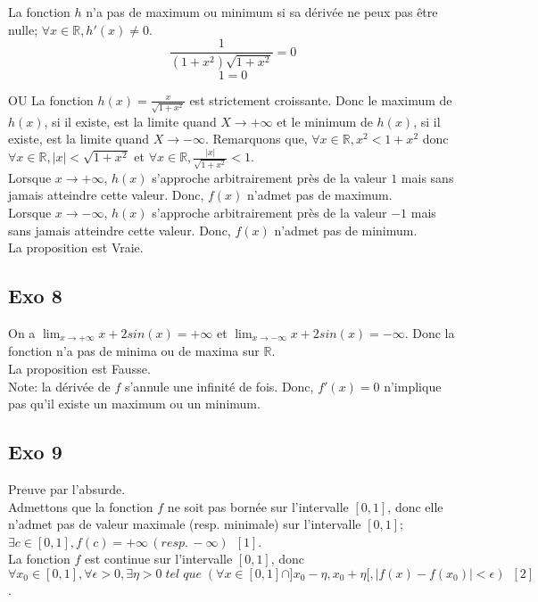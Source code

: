 \documentclass[]{book}
\theoremstyle{definition}
\newcommand{\bb}[1]{\mathbb{#1}}
\newcommand{\R}{\bb{R}}
\begin{document}
La fonction $h$ n'a pas de maximum ou minimum si sa d\'eriv\'ee ne peux pas \^etre nulle; $\forall x \in \R, h'(x) \neq 0$.
$$ \frac{1}{(1+x^2)\sqrt{1+x^2}} = 0 $$
$$ 1 = 0 $$


OU
La fonction $h(x) = \frac{x}{\sqrt{1+x^2}}$ est strictement croissante. Donc le maximum de $h(x)$, si il existe, est la limite quand $X \to +\infty$ et le minimum de $h(x)$, si il existe, est la limite quand $X \to -\infty$.
Remarquons que, $\forall x \in \R, x^2 < 1 + x^2$ donc $\forall x \in \R, |x| < \sqrt{1 + x^2}$ et $\forall x \in \R, \frac{|x|}{\sqrt{1 + x^2}} < 1$.\\
 
Lorsque $x \to +\infty$, $h(x)$ s'approche arbitrairement pr\`es de la valeur $1$ mais sans jamais atteindre cette valeur. Donc, $f(x)$ n'admet pas de maximum.\\

Lorsque $x \to -\infty$, $h(x)$ s'approche arbitrairement pr\`es de la valeur $-1$ mais sans jamais atteindre cette valeur. Donc, $f(x)$ n'admet pas de minimum.\\


La proposition est Vraie.



\subsection*{Exo 8}
On a $\lim_{x \to +\infty} x + 2sin(x) = +\infty$ et $\lim_{x \to -\infty} x + 2sin(x) = -\infty$. Donc la fonction n'a pas de minima ou de maxima sur $\R$.\\

La proposition est Fausse.\\

Note: la d\'eriv\'ee de $f$ s'annule une infinit\'e de fois. Donc, $f'(x)=0$ n'implique pas qu'il existe un maximum ou un minimum.


\subsection*{Exo 9}
Preuve par l'absurde. \\

Admettons que la fonction $f$ ne soit pas born\'ee sur l'intervalle $[0,1]$, donc elle n'admet pas de valeur maximale (resp. minimale) sur l'intervalle $[0,1]$; $\exists c \in [0,1], f(c) = +\infty\, (resp.\, -\infty)\,\,\,[1]$.\\

La fonction $f$ est continue sur l'intervalle $[0,1]$, donc $\forall x_0 \in [0,1], \forall \epsilon >0, \exists \eta > 0\; tel\; que\; (\forall x \in [0,1] \cap ]x_0-\eta, x_0+\eta[, |f(x)-f(x_0)| < \epsilon)\,\,\,[2]$. \\ 
\end{document}
